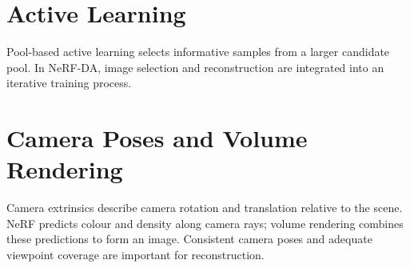 \section{Active Learning}
Pool-based active learning selects informative samples from a larger candidate pool. In NeRF-DA, image selection and reconstruction are integrated into an iterative training process.\cite{bib1}
\section{Camera Poses and Volume Rendering}
Camera extrinsics describe camera rotation and translation relative to the scene. NeRF predicts colour and density along camera rays; volume rendering combines these predictions to form an image. Consistent camera poses and adequate viewpoint coverage are important for reconstruction.\cite{bib8}
